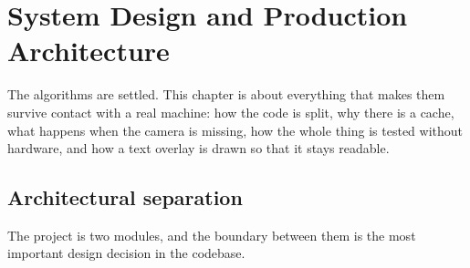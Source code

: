 \chapter{System Design and Production Architecture}
\label{ch:architecture}

The algorithms are settled. This chapter is about everything that makes them survive contact with a
real machine: how the code is split, why there is a cache, what happens when the camera is missing,
how the whole thing is tested without hardware, and how a text overlay is drawn so that it stays
readable.

\section{Architectural separation}
\label{sec:split}

The project is two modules, and the boundary between them is the most important design decision in
the codebase.


